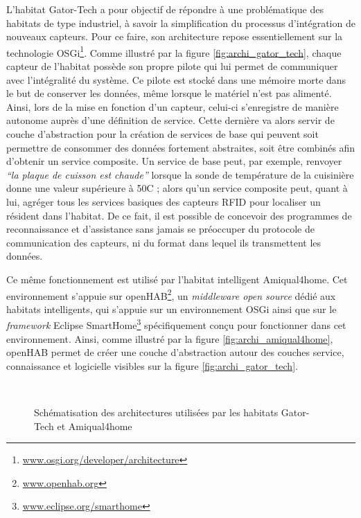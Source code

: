 L'habitat Gator-Tech a pour objectif de répondre à une problématique des habitats de type industriel, à savoir la simplification du processus d'intégration de nouveaux capteurs. Pour ce faire, son architecture repose essentiellement sur la technologie \acs{OSGi}\footnote{\url{www.osgi.org/developer/architecture}}. Comme illustré par la figure \ref{fig:archi_gator_tech}, chaque capteur de l'habitat possède son propre pilote qui lui permet de communiquer avec l'intégralité du système. Ce pilote est stocké dans une mémoire morte dans le but de conserver les données, même lorsque le matériel n'est pas alimenté. Ainsi, lors de la mise en fonction d'un capteur, celui-ci s'enregistre de manière autonome auprès d'une définition de service. Cette dernière va alors servir de couche d'abstraction pour la création de services de base qui peuvent soit permettre de consommer des données fortement abstraites, soit être combinés afin d'obtenir un service composite. Un service de base peut, par exemple, renvoyer \textit{``la plaque de cuisson est chaude''} lorsque la sonde de température de la cuisinière donne une valeur supérieure à 50\textdegree{}C ; alors qu'un service composite peut, quant à lui, agréger tous les services basiques des capteurs \ac{RFID} pour localiser un résident dans l'habitat. De ce fait, il est possible de concevoir des programmes de reconnaissance et d'assistance sans jamais se préoccuper du protocole de communication des capteurs, ni du format dans lequel ils transmettent les données.

Ce même fonctionnement est utilisé par l'habitat intelligent Amiqual4home. Cet environnement s'appuie sur \ac{openHAB}\footnote{\url{www.openhab.org}}, un \textit{middleware open source} dédié aux habitats intelligents, qui s'appuie sur un environnement \acs{OSGi} ainsi que sur le \textit{framework} Eclipse SmartHome\footnote{\url{www.eclipse.org/smarthome}} spécifiquement conçu pour fonctionner dans cet environnement. Ainsi, comme illustré par la figure \ref{fig:archi_amiqual4home}, \acs{openHAB} permet de créer une couche d'abstraction autour des couches service, connaissance et logicielle visibles sur la figure \ref{fig:archi_gator_tech}.

\begin{figure}
	\centering
	\\[20pt]
	\caption{Schématisation des architectures utilisées par les habitats Gator-Tech et Amiqual4home}
\end{figure}


